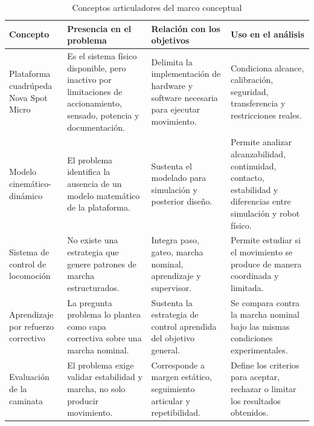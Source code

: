 \begin{table}[H]
\centering
\caption{Conceptos articuladores del marco conceptual}
\label{tab:marco-conceptual-relacion}
\small
\setlength{\tabcolsep}{3pt}
\begin{tabular}{p{}p{}p{}p{}}
\toprule
Concepto & Presencia en el problema & Relación con los objetivos & Uso en el análisis \\
\midrule
Plataforma cuadrúpeda Nova Spot Micro & Es el sistema físico disponible, pero inactivo por limitaciones de accionamiento, sensado, potencia y documentación. & Delimita la implementación de hardware y software necesaria para ejecutar movimiento. & Condiciona alcance, calibración, seguridad, transferencia y restricciones reales. \\
Modelo cinemático-dinámico & El problema identifica la ausencia de un modelo matemático de la plataforma. & Sustenta el modelado para simulación y posterior diseño. & Permite analizar alcanzabilidad, continuidad, contacto, estabilidad y diferencias entre simulación y robot físico. \\
Sistema de control de locomoción & No existe una estrategia que genere patrones de marcha estructurados. & Integra paso, gateo, marcha nominal, aprendizaje y supervisor. & Permite estudiar si el movimiento se produce de manera coordinada y limitada. \\
Aprendizaje por refuerzo correctivo & La pregunta problema lo plantea como capa correctiva sobre una marcha nominal. & Sustenta la estrategia de control aprendida del objetivo general. & Se compara contra la marcha nominal bajo las mismas condiciones experimentales. \\
Evaluación de la caminata & El problema exige validar estabilidad y marcha, no solo producir movimiento. & Corresponde a margen estático, seguimiento articular y repetibilidad. & Define los criterios para aceptar, rechazar o limitar los resultados obtenidos. \\
\bottomrule
\end{tabular}
\end{table}
